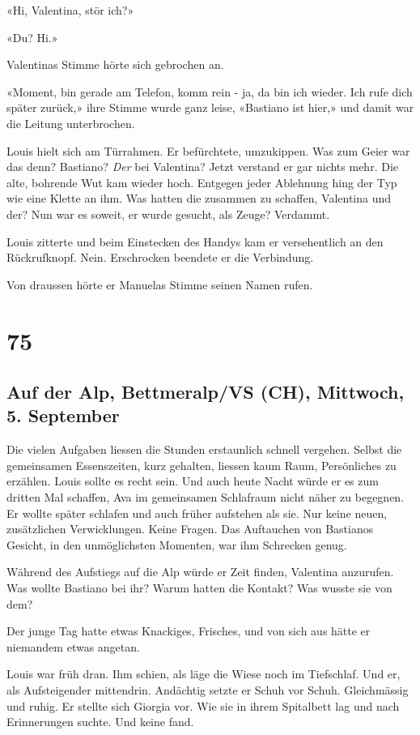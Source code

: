 «Hi, Valentina, stör ich?»

«Du? Hi.»

Valentinas Stimme hörte sich gebrochen an.

«Moment, bin gerade am Telefon, komm rein - ja, da bin ich wieder. Ich
rufe dich später zurück,» ihre Stimme wurde ganz leise, «Bastiano ist
hier,» und damit war die Leitung unterbrochen.

Louis hielt sich am Türrahmen. Er befürchtete, umzukippen. Was zum Geier
war das denn? Bastiano? \emph{Der} bei Valentina? Jetzt verstand er gar
nichts mehr. Die alte, bohrende Wut kam wieder hoch. Entgegen jeder
Ablehnung hing der Typ wie eine Klette an ihm. Was hatten die zusammen
zu schaffen, Valentina und der? Nun war es soweit, er wurde gesucht, als
Zeuge? Verdammt.

Louis zitterte und beim Einstecken des Handys kam er versehentlich an
den Rückrufknopf. Nein. Erschrocken beendete er die Verbindung.

Von draussen hörte er Manuelas Stimme seinen Namen rufen.

\chapter{75}\label{section-75}

\section{Auf der Alp, Bettmeralp/VS (CH), Mittwoch, 5.
September}\label{auf-der-alp-bettmeralpvs-ch-mittwoch-5.-september}

Die vielen Aufgaben liessen die Stunden erstaunlich schnell vergehen.
Selbst die gemeinsamen Essenszeiten, kurz gehalten, liessen kaum Raum,
Persönliches zu erzählen. Louis sollte es recht sein. Und auch heute
Nacht würde er es zum dritten Mal schaffen, Ava im gemeinsamen
Schlafraum nicht näher zu begegnen. Er wollte später schlafen und auch
früher aufstehen als sie. Nur keine neuen, zusätzlichen Verwicklungen.
Keine Fragen. Das Auftauchen von Bastianos Gesicht, in den unmöglichsten
Momenten, war ihm Schrecken genug.

Während des Aufstiegs auf die Alp würde er Zeit finden, Valentina
anzurufen. Was wollte Bastiano bei ihr? Warum hatten die Kontakt? Was
wusste sie von dem?

Der junge Tag hatte etwas Knackiges, Frisches, und von sich aus hätte er
niemandem etwas angetan.

Louis war früh dran. Ihm schien, als läge die Wiese noch im Tiefschlaf.
Und er, als Aufsteigender mittendrin. Andächtig setzte er Schuh vor
Schuh. Gleichmässig und ruhig. Er stellte sich Giorgia vor. Wie sie in
ihrem Spitalbett lag und nach Erinnerungen suchte. Und keine fand.

